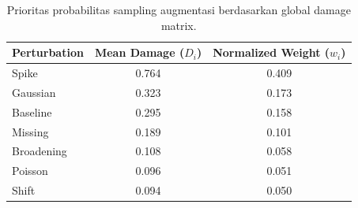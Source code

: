 \begin{table}[H]
\centering
\caption{Prioritas probabilitas sampling augmentasi berdasarkan global damage matrix.}
\label{tab:aug_weights}
\begin{tabular}{lcc}
\toprule
\textbf{Perturbation} & \textbf{Mean Damage} ($D_i$) & \textbf{Normalized Weight} ($w_i$) \\
\midrule
Spike & 0.764 & 0.409 \\
Gaussian & 0.323 & 0.173 \\
Baseline & 0.295 & 0.158 \\
Missing & 0.189 & 0.101 \\
Broadening & 0.108 & 0.058 \\
Poisson & 0.096 & 0.051 \\
Shift & 0.094 & 0.050 \\
\bottomrule
\end{tabular}
\end{table}
